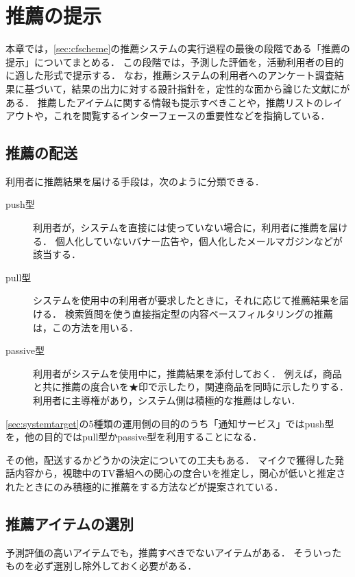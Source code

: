 \chapter{推薦の提示}
\label{sec:present}

本章では，\ref{sec:cfscheme}の推薦システムの実行過程の最後の段階である「推薦の提示」についてまとめる．
この段階では，予測した評価を，活動利用者の目的に適した形式で提示する．
なお，推薦システムの利用者へのアンケート調査結果に基づいて，結果の出力に対する設計指針を，定性的な面から論じた文献に\cite{sigir:01:01}がある．
推薦したアイテムに関する情報も提示すべきことや，推薦リストのレイアウトや，これを閲覧するインターフェースの重要性などを指摘している．

\section{推薦の配送}
\label{sec:present:delivery}

利用者に推薦結果を届ける手段は，次のように分類できる．
\begin{description}
 \item[push型]
 利用者が，システムを直接には使っていない場合に，利用者に推薦を届ける．
 個人化していないバナー広告や，個人化したメールマガジンなどが該当する．
 \item[pull型]
 システムを使用中の利用者が要求したときに，それに応じて推薦結果を届ける．
 検索質問を使う直接指定型の内容ベースフィルタリングの推薦は，この方法を用いる．
 \item[passive型]
 利用者がシステムを使用中に，推薦結果を添付しておく．
 例えば，商品と共に推薦の度合いを★印で示したり，関連商品を同時に示したりする．
 利用者に主導権があり，システム側は積極的な推薦はしない．
\end{description}
\ref{sec:systemtarget}の5種類の運用側の目的のうち「通知サービス」ではpush型を，他の目的ではpull型かpassive型を利用することになる．

その他，配送するかどうかの決定についての工夫もある．
マイクで獲得した発話内容から，視聴中のTV番組への関心の度合いを推定し，関心が低いと推定されたときにのみ積極的に推薦をする方法\cite{trjsai:07:01}などが提案されている．

\section{推薦アイテムの選別}
\label{sec:present:selection}

予測評価の高いアイテムでも，推薦すべきでないアイテムがある．
そういったものを必ず選別し除外しておく必要がある．

